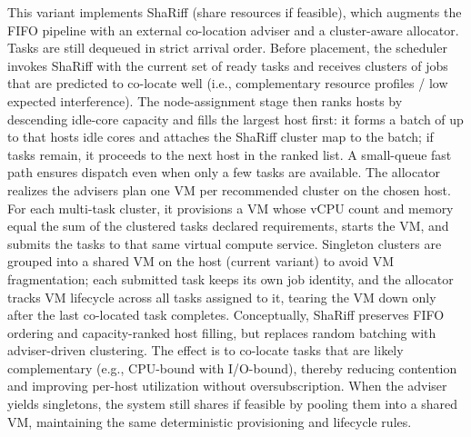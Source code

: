This variant implements ShaRiff (share resources if feasible), which augments the FIFO pipeline with an external co-location adviser and a cluster-aware allocator. Tasks are still dequeued in strict arrival order. Before placement, the scheduler invokes ShaRiff with the current set of ready tasks and receives clusters of jobs that are predicted to co-locate well (i.e., complementary resource profiles / low expected interference). The node-assignment stage then ranks hosts by descending idle-core capacity and fills the largest host first: it forms a batch of up to that hosts idle cores and attaches the ShaRiff cluster map to the batch; if tasks remain, it proceeds to the next host in the ranked list. A small-queue fast path ensures dispatch even when only a few tasks are available.
The allocator realizes the advisers plan one VM per recommended cluster on the chosen host. For each multi-task cluster, it provisions a VM whose vCPU count and memory equal the sum of the clustered tasks declared requirements, starts the VM, and submits the tasks to that same virtual compute service. Singleton clusters are grouped into a shared VM on the host (current variant) to avoid VM fragmentation; each submitted task keeps its own job identity, and the allocator tracks VM lifecycle across all tasks assigned to it, tearing the VM down only after the last co-located task completes.
Conceptually, ShaRiff preserves FIFO ordering and capacity-ranked host filling, but replaces random batching with adviser-driven clustering. The effect is to co-locate tasks that are likely complementary (e.g., CPU-bound with I/O-bound), thereby reducing contention and improving per-host utilization without oversubscription. When the adviser yields singletons, the system still shares if feasible by pooling them into a shared VM, maintaining the same deterministic provisioning and lifecycle rules.


